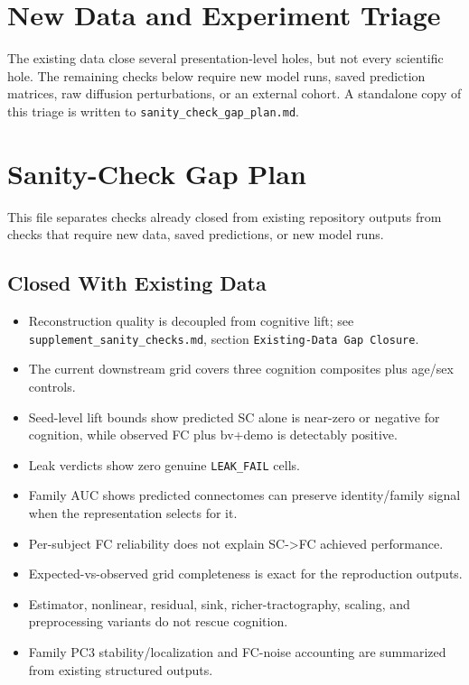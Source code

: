 \section{New Data and Experiment Triage}\label{new-data-and-experiment-triage}

The existing data close several presentation-level holes, but not every scientific hole. The remaining checks below require new model runs, saved prediction matrices, raw diffusion perturbations, or an external cohort. A standalone copy of this triage is written to \texttt{sanity\_check\_gap\_plan.md}.

\section{Sanity-Check Gap Plan}\label{sanity-check-gap-plan}

This file separates checks already closed from existing repository outputs from checks that require new data, saved predictions, or new model runs.

\subsection{Closed With Existing Data}\label{closed-with-existing-data}

\begin{itemize}
\item
  Reconstruction quality is decoupled from cognitive lift; see \texttt{supplement\_sanity\_checks.md}, section \texttt{Existing-Data\ Gap\ Closure}.
\item
  The current downstream grid covers three cognition composites plus age/sex controls.
\item
  Seed-level lift bounds show predicted SC alone is near-zero or negative for cognition, while observed FC plus bv+demo is detectably positive.
\item
  Leak verdicts show zero genuine \texttt{LEAK\_FAIL} cells.
\item
  Family AUC shows predicted connectomes can preserve identity/family signal when the representation selects for it.
\item
  Per-subject FC reliability does not explain SC-\textgreater FC achieved performance.
\item
  Expected-vs-observed grid completeness is exact for the reproduction outputs.
\item
  Estimator, nonlinear, residual, sink, richer-tractography, scaling, and preprocessing variants do not rescue cognition.
\item
  Family PC3 stability/localization and FC-noise accounting are summarized from existing structured outputs.
\end{itemize}

